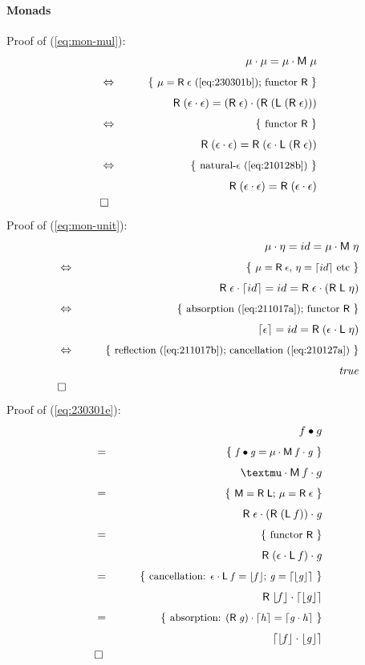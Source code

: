 \documentclass{elsarticle}
\newcommand{\Varid}[1]{\mathit{#1}}
\def\comp{ \mathbin{\cdot} }
\def\fun#1{\mathsf{#1}}
\def\just#1#2{\\ &#1& \rule{2em}{0pt} \{ \mbox{\rule[-.7em]{0pt}{1.8em} \small #2 \/} \} \nonumber\\ && }
\def\qed{\\&\Box&\nonumber}
\def\kcomp{\mathbin{\bullet}}
\def\start{&&}
\def\equiv{\Leftrightarrow}
\begin{document}
\paragraph{Monads}
Proof of (\ref{eq:mon-mul}):
\begin{eqnarray*}
\start
	\ensuremath{\mu \comp \mu\mathrel{=}\mu \comp \fun M \;\mu}
%
\just\equiv{\ensuremath{\mu\mathrel{=}\fun R \;\epsilon } (\ref{eq:230301b}); functor \ensuremath{\fun R } }
%
	\ensuremath{\fun R \;(\epsilon  \comp \epsilon )\mathrel{=}(\fun R \;\epsilon ) \comp (\fun R \;(\fun L \;(\fun R \;\epsilon )))}
%
\just\equiv{functor \ensuremath{\fun R } }
%
	\ensuremath{\fun R \;(\epsilon  \comp \epsilon )\mathrel{=}\fun R \;(\epsilon  \comp \fun L \;(\fun R \;\epsilon ))}
%
\just\equiv{ natural-\ensuremath{\epsilon } (\ref{eq:210128b}) }
%
	\ensuremath{\fun R \;(\epsilon  \comp \epsilon )\mathrel{=}\fun R \;(\epsilon  \comp \epsilon )}
\qed
\end{eqnarray*}
Proof of (\ref{eq:mon-unit}):
\begin{eqnarray*}
\start
	\ensuremath{\mu \comp \eta \mathrel{=}{id}\mathrel{=}\mu \comp \fun M \;\eta }
%
\just\equiv{\ensuremath{\mu\mathrel{=}\fun R \;\epsilon }, \ensuremath{\eta \mathrel{=}\lceil {id}\rceil} etc}
%
	\ensuremath{\fun R \;\epsilon  \comp \lceil {id}\rceil\mathrel{=}{id}\mathrel{=}\fun R \;\epsilon  \comp (\fun R \;\fun L \;\eta )}
%
\just\equiv{absorption (\ref{eq:211017a}); functor \ensuremath{\fun R }  }
%
	\ensuremath{\lceil \epsilon \rceil\mathrel{=}{id}\mathrel{=}\fun R \;(\epsilon  \comp \fun L \;\eta )}
%
\just\equiv{ reflection (\ref{eq:211017b}); cancellation (\ref{eq:210127a}) }
%
	\ensuremath{\Varid{true}}
\qed
\end{eqnarray*}
Proof of (\ref{eq:230301e}): 
\begin{eqnarray*}
\start
	f \kcomp g
%
\just={ \ensuremath{\Varid{f}\kcomp\Varid{g}\mathrel{=}\mu \comp \fun M \;\Varid{f} \comp \Varid{g}}} %
%
	µ \comp \ensuremath{\fun M \;\Varid{f}} \comp g
%
\just={ \ensuremath{\fun M \mathrel{=}\fun R \;\fun L }; \ensuremath{\mu\mathrel{=}\fun R \;\epsilon } }
%
	\ensuremath{\fun R \;\epsilon  \comp (\fun R \;(\fun L \;\Varid{f})) \comp \Varid{g}}
%
\just={ functor \ensuremath{\fun R } }
%
	\ensuremath{\fun R \;(\epsilon  \comp \fun L \;\Varid{f}) \comp \Varid{g}}
%
\just={ cancellation: \ensuremath{\epsilon  \comp \fun L \;\Varid{f}\mathrel{=}\lfloor \Varid{f}\rfloor}; \ensuremath{\Varid{g}\mathrel{=}\lceil \lfloor \Varid{g}\rfloor\rceil} }
%
	\ensuremath{\fun R \;\lfloor \Varid{f}\rfloor \comp \lceil \lfloor \Varid{g}\rfloor\rceil}
%
\just={ absorption: \ensuremath{(\fun R \;\Varid{g}) \comp \lceil \Varid{h}\rceil\mathrel{=}\lceil \Varid{g} \comp \Varid{h}\rceil} }
%
	\ensuremath{\lceil \lfloor \Varid{f}\rfloor \comp \lfloor \Varid{g}\rfloor\rceil}
\qed
\end{eqnarray*}
\end{document}
